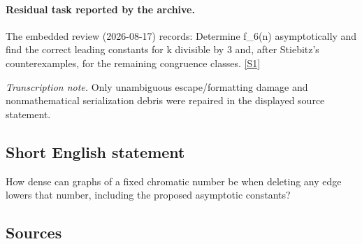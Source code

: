 \documentclass[11pt,a4paper]{article}
\newcommand{\sref}[2]{\hyperlink{source:#1:#2}{[S#2]}}
\begin{document}
\paragraph{Residual task reported by the archive.}

The embedded review (2026-08-17) records: Determine f\_6(n) asymptotically and find the correct leading constants for k divisible by 3 and, after Stiebitz's counterexamples, for the remaining congruence classes. \sref{statement}{1}

{\small\emph{Transcription note.} Only unambiguous escape/formatting damage and nonmathematical serialization debris were repaired in the displayed source statement.}

\subsection{Short English statement}

How dense can graphs of a fixed chromatic number be when deleting any edge lowers that number, including the proposed asymptotic constants?

\subsection{Sources}
\end{document}
